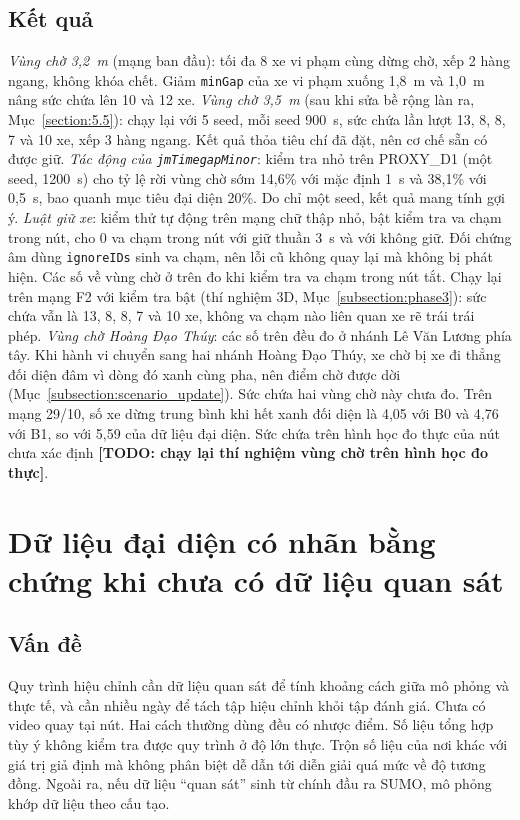 \documentclass[../main.tex]{subfiles}
\begin{document}
\subsection{Kết quả}

\emph{Vùng chờ 3,2~m} (mạng ban đầu): tối đa 8 xe vi phạm cùng dừng chờ, xếp 2 hàng ngang, không khóa chết. Giảm \texttt{minGap} của xe vi phạm xuống 1,8~m và 1,0~m nâng sức chứa lên 10 và 12 xe. \emph{Vùng chờ 3,5~m} (sau khi sửa bề rộng làn ra, Mục~\ref{section:5.5}): chạy lại với 5 seed, mỗi seed 900~s, sức chứa lần lượt 13, 8, 8, 7 và 10 xe, xếp 3 hàng ngang. Kết quả thỏa tiêu chí đã đặt, nên cơ chế sẵn có được giữ. \emph{Tác động của \texttt{jmTimegapMinor}}: kiểm tra nhỏ trên PROXY\_D1 (một seed, 1200~s) cho tỷ lệ rời vùng chờ sớm 14,6\% với mặc định 1~s và 38,1\% với 0,5~s, bao quanh mục tiêu đại diện 20\%. Do chỉ một seed, kết quả mang tính gợi ý. \emph{Luật giữ xe}: kiểm thử tự động trên mạng chữ thập nhỏ, bật kiểm tra va chạm trong nút, cho 0 va chạm trong nút với giữ thuần 3~s và với không giữ. Đối chứng âm dùng \texttt{ignoreIDs} sinh va chạm, nên lỗi cũ không quay lại mà không bị phát hiện. Các số về vùng chờ ở trên đo khi kiểm tra va chạm trong nút tắt. Chạy lại trên mạng F2 với kiểm tra bật (thí nghiệm 3D, Mục~\ref{subsection:phase3}): sức chứa vẫn là 13, 8, 8, 7 và 10 xe, không va chạm nào liên quan xe rẽ trái trái phép. \emph{Vùng chờ Hoàng Đạo Thúy}: các số trên đều đo ở nhánh Lê Văn Lương phía tây. Khi hành vi chuyển sang hai nhánh Hoàng Đạo Thúy, xe chờ bị xe đi thẳng đối diện đâm vì dòng đó xanh cùng pha, nên điểm chờ được dời (Mục~\ref{subsection:scenario_update}). Sức chứa hai vùng chờ này chưa đo. Trên mạng 29/10, số xe dừng trung bình khi hết xanh đối diện là 4,05 với B0 và 4,76 với B1, so với 5,59 của dữ liệu đại diện.
Sức chứa trên hình học đo thực của nút chưa xác định \textbf{[TODO: chạy lại thí nghiệm vùng chờ trên hình học đo thực]}.

\section{Dữ liệu đại diện có nhãn bằng chứng khi chưa có dữ liệu quan sát}
\label{section:5.4}

\subsection{Vấn đề}

Quy trình hiệu chỉnh cần dữ liệu quan sát để tính khoảng cách giữa mô phỏng và thực tế, và cần nhiều ngày để tách tập hiệu chỉnh khỏi tập đánh giá. Chưa có video quay tại nút. Hai cách thường dùng đều có nhược điểm. Số liệu tổng hợp tùy ý không kiểm tra được quy trình ở độ lớn thực. Trộn số liệu của nơi khác với giá trị giả định mà không phân biệt dễ dẫn tới diễn giải quá mức về độ tương đồng. Ngoài ra, nếu dữ liệu ``quan sát'' sinh từ chính đầu ra SUMO, mô phỏng khớp dữ liệu theo cấu tạo.
\end{document}
